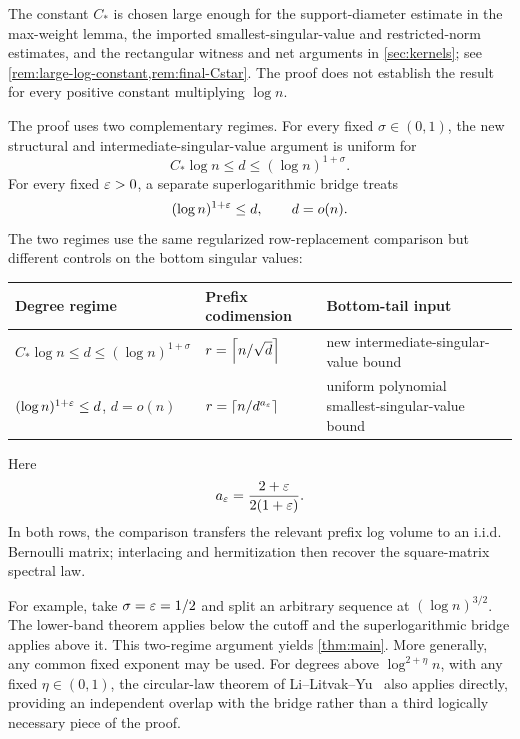 The constant $C_*$ is chosen large enough for the support-diameter estimate in the max-weight lemma, the imported smallest-singular-value and restricted-norm estimates, and the rectangular witness and net arguments in \cref{sec:kernels}; see \cref{rem:large-log-constant,rem:final-Cstar}. The proof does not establish the result for every positive constant multiplying $\log n$.

The proof uses two complementary regimes. For every fixed $\sigma\in(0,1)$, the new structural and intermediate-singular-value argument is uniform for
\begin{equation}\label{eq:lower-band-intro}
  C_*\log n\le d\le (\log n)^{1+\sigma}.
\end{equation}
For every fixed $\varepsilon>0$, a separate superlogarithmic bridge treats
\begin{equation}\label{eq:superlog-intro}
  (\log n)^{1+\varepsilon}\le d,
  \qquad d=o(n).
\end{equation}
The two regimes use the same regularized row-replacement comparison but different controls on the bottom singular values:
\begin{center}
\begin{tabular}{p{}p{}p{}}
\toprule
Degree regime & Prefix codimension & Bottom-tail input\\
\midrule
$C_*\log n\le d\le(\log n)^{1+\sigma}$ & $r=\left\lceil n/\sqrt d\right\rceil$ & new intermediate-singular-value bound\\
$(\log n)^{1+\varepsilon}\le d$, $d=o(n)$ & $r=\left\lceil n/d^{a_\varepsilon}\right\rceil$ & uniform polynomial smallest-singular-value bound\\
\bottomrule
\end{tabular}
\end{center}
Here
\[
  a_\varepsilon=\frac{2+\varepsilon}{2(1+\varepsilon)}.
\]
In both rows, the comparison transfers the relevant prefix log volume to an i.i.d. Bernoulli matrix; interlacing and hermitization then recover the square-matrix spectral law.

For example, take $\sigma=\varepsilon=1/2$ and split an arbitrary sequence at $(\log n)^{3/2}$. The lower-band theorem applies below the cutoff and the superlogarithmic bridge applies above it. This two-regime argument yields \cref{thm:main}. More generally, any common fixed exponent may be used. For degrees above $\log^{2+\eta}n$, with any fixed $\eta\in(0,1)$, the circular-law theorem of Li--Litvak--Yu~\cite[Theorem~1.3]{LLY26a} also applies directly, providing an independent overlap with the bridge rather than a third logically necessary piece of the proof.

